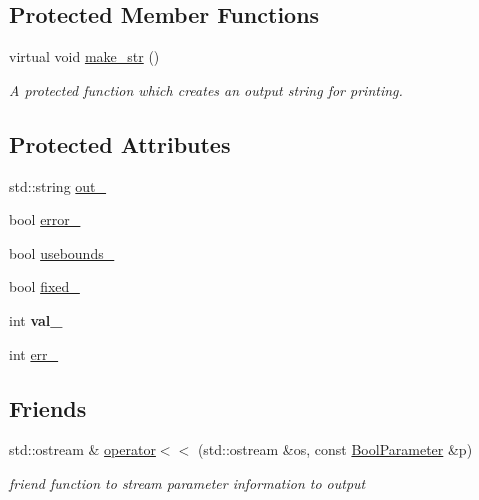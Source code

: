 \subsection*{Protected Member Functions}
\begin{DoxyCompactItemize}
\item 
virtual void \hyperlink{class_bool_parameter_ad385b85691363fa3a304455f110cb1eb}{make\-\_\-str} ()
\begin{DoxyCompactList}\small\item\em A protected function which creates an output string for printing. \end{DoxyCompactList}\end{DoxyCompactItemize}
\subsection*{Protected Attributes}
\begin{DoxyCompactItemize}
\item 
std\-::string \hyperlink{class_bool_parameter_a836a9f6e5b814156665c2de8c00c31a2}{out\-\_\-}
\item 
bool \hyperlink{class_bool_parameter_a9c192361dd600e72bbf06eee33fa0899}{error\-\_\-}
\item 
bool \hyperlink{class_bool_parameter_a16c8c857c4c9cd45714e7858b41f55f2}{usebounds\-\_\-}
\item 
bool \hyperlink{class_bool_parameter_acaa36aae968e133f21b2cebb6216dee9}{fixed\-\_\-}
\item 
\hypertarget{class_bool_parameter_a5ac86e1f505fad22eeea171bcc8748c9}{int {\bfseries val\-\_\-}}\label{class_bool_parameter_a5ac86e1f505fad22eeea171bcc8748c9}

\item 
int \hyperlink{class_bool_parameter_a21d7587dbe2a95be0329ef9933ff041d}{err\-\_\-}
\end{DoxyCompactItemize}
\subsection*{Friends}
\begin{DoxyCompactItemize}
\item 
std\-::ostream \& \hyperlink{class_bool_parameter_a5239796d0d37d86b7003f4337efe920a}{operator$<$$<$} (std\-::ostream \&os, const \hyperlink{class_bool_parameter}{Bool\-Parameter} \&p)
\begin{DoxyCompactList}\small\item\em friend function to stream parameter information to output \end{DoxyCompactList}\end{DoxyCompactItemize}


